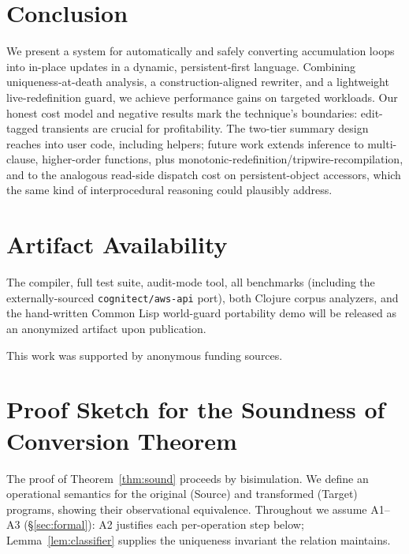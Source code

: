 \documentclass[sigplan,review,anonymous]{acmart}
\begin{document}
\section{Conclusion}
\label{sec:conclusion}
We present a system for automatically and safely converting accumulation loops into in-place updates in a dynamic, persistent-first language. Combining uniqueness-at-death analysis, a construction-aligned rewriter, and a lightweight live-redefinition guard, we achieve performance gains on targeted workloads. Our honest cost model and negative results mark the technique's boundaries: edit-tagged transients are crucial for profitability. The two-tier summary design reaches into user code, including helpers; future work extends inference to multi-clause, higher-order functions, plus monotonic-redefinition/tripwire-recompilation, and to the analogous read-side dispatch cost on persistent-object accessors, which the same kind of interprocedural reasoning could plausibly address.

\section*{Artifact Availability}
The compiler, full test suite, audit-mode tool, all benchmarks (including the externally-sourced \texttt{cognitect/aws-api} port), both Clojure corpus analyzers, and the hand-written Common Lisp world-guard portability demo will be released as an anonymized artifact upon publication.

\begin{acks}
This work was supported by anonymous funding sources.
\end{acks}




\appendix

\section{Proof Sketch for the Soundness of Conversion Theorem}
\label{app:proof}

The proof of Theorem~\ref{thm:sound} proceeds by bisimulation. We define an operational semantics for the original (Source) and transformed (Target) programs, showing their observational equivalence. Throughout we assume A1--A3 (§\ref{sec:formal}): A2 justifies each per-operation step below; Lemma~\ref{lem:classifier} supplies the uniqueness invariant the relation maintains.
\end{document}
